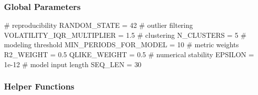 \documentclass[
  letterpaper,
  DIV=11,
  numbers=noendperiod]{scrartcl}
\newenvironment{Shaded}{\begin{snugshade}}{\end{snugshade}}
\newcommand{\CommentTok}[1]{\textcolor[rgb]{0.37,0.37,0.37}{#1}}
\newcommand{\DecValTok}[1]{\textcolor[rgb]{0.68,0.00,0.00}{#1}}
\newcommand{\FloatTok}[1]{\textcolor[rgb]{0.68,0.00,0.00}{#1}}
\newcommand{\NormalTok}[1]{\textcolor[rgb]{0.00,0.23,0.31}{#1}}
\newcommand{\OperatorTok}[1]{\textcolor[rgb]{0.37,0.37,0.37}{#1}}
\begin{document}
\subsubsection{Global Parameters}\label{global-parameters}

\begin{Shaded}
\begin{Highlighting}[]
\CommentTok{\# reproducibility}
\NormalTok{RANDOM\_STATE }\OperatorTok{=} \DecValTok{42}
\CommentTok{\# outlier filtering}
\NormalTok{VOLATILITY\_IQR\_MULTIPLIER }\OperatorTok{=} \FloatTok{1.5}
\CommentTok{\# clustering}
\NormalTok{N\_CLUSTERS }\OperatorTok{=} \DecValTok{5}
\CommentTok{\# modeling threshold}
\NormalTok{MIN\_PERIODS\_FOR\_MODEL }\OperatorTok{=} \DecValTok{10}
\CommentTok{\# metric weights}
\NormalTok{R2\_WEIGHT }\OperatorTok{=} \FloatTok{0.5}
\NormalTok{QLIKE\_WEIGHT }\OperatorTok{=} \FloatTok{0.5}
\CommentTok{\# numerical stability}
\NormalTok{EPSILON }\OperatorTok{=} \FloatTok{1e{-}12}
\CommentTok{\# model input length}
\NormalTok{SEQ\_LEN }\OperatorTok{=} \DecValTok{30}
\end{Highlighting}
\end{Shaded}

\subsubsection{Helper Functions}\label{helper-functions}
\end{document}
